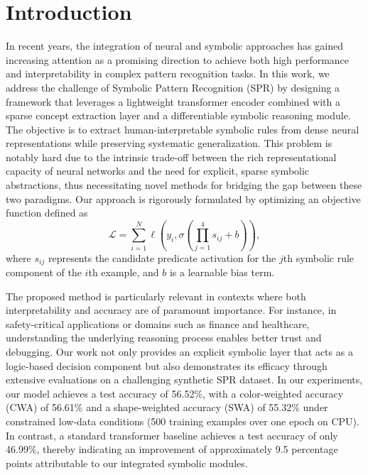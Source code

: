 \documentclass{article}
\begin{document}
\section{Introduction}
In recent years, the integration of neural and symbolic approaches has gained increasing attention as a promising direction to achieve both high performance and interpretability in complex pattern recognition tasks. In this work, we address the challenge of Symbolic Pattern Recognition (SPR) by designing a framework that leverages a lightweight transformer encoder combined with a sparse concept extraction layer and a differentiable symbolic reasoning module. The objective is to extract human-interpretable symbolic rules from dense neural representations while preserving systematic generalization. This problem is notably hard due to the intrinsic trade-off between the rich representational capacity of neural networks and the need for explicit, sparse symbolic abstractions, thus necessitating novel methods for bridging the gap between these two paradigms. Our approach is rigorously formulated by optimizing an objective function defined as 
\[
\mathcal{L} = \sum_{i=1}^{N} \ell\left(y_i, \sigma\left(\prod_{j=1}^{4} s_{ij} + b\right)\right),
\]
where \(s_{ij}\) represents the candidate predicate activation for the \(j\)th symbolic rule component of the \(i\)th example, and \(b\) is a learnable bias term.

The proposed method is particularly relevant in contexts where both interpretability and accuracy are of paramount importance. For instance, in safety-critical applications or domains such as finance and healthcare, understanding the underlying reasoning process enables better trust and debugging. Our work not only provides an explicit symbolic layer that acts as a logic-based decision component but also demonstrates its efficacy through extensive evaluations on a challenging synthetic SPR dataset. In our experiments, our model achieves a test accuracy of 56.52\%, with a color-weighted accuracy (CWA) of 56.61\% and a shape-weighted accuracy (SWA) of 55.32\% under constrained low-data conditions (500 training examples over one epoch on CPU). In contrast, a standard transformer baseline achieves a test accuracy of only 46.99\%, thereby indicating an improvement of approximately 9.5 percentage points attributable to our integrated symbolic modules.
\end{document}
